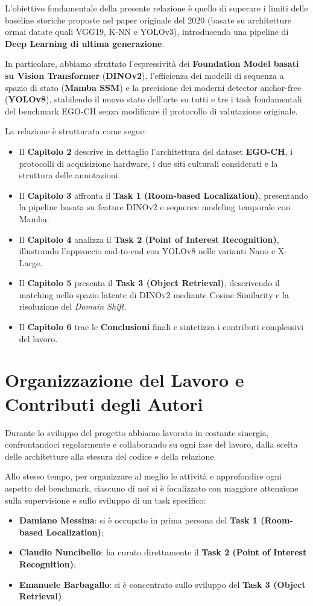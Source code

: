 \documentclass[a4paper,12pt]{report}
\begin{document}
L'obiettivo fondamentale della presente relazione è quello di superare i limiti delle baseline storiche proposte nel paper originale del 2020 (basate su architetture ormai datate quali VGG19, K-NN e YOLOv3), introducendo una pipeline di \textbf{Deep Learning di ultima generazione}. 

In particolare, abbiamo sfruttato l'espressività dei \textbf{Foundation Model basati su Vision Transformer} (\textbf{DINOv2}), l'efficienza dei modelli di sequenza a spazio di stato (\textbf{Mamba SSM}) e la precisione dei moderni detector anchor-free (\textbf{YOLOv8}), stabilendo il nuovo stato dell'arte su tutti e tre i task fondamentali del benchmark EGO-CH senza modificare il protocollo di valutazione originale.

La relazione è strutturata come segue:
\begin{itemize}
    \item Il \textbf{Capitolo 2} descrive in dettaglio l'architettura del dataset \textbf{EGO-CH}, i protocolli di acquisizione hardware, i due siti culturali considerati e la struttura delle annotazioni.
    \item Il \textbf{Capitolo 3} affronta il \textbf{Task 1 (Room-based Localization)}, presentando la pipeline basata su feature DINOv2 e sequence modeling temporale con Mamba.
    \item Il \textbf{Capitolo 4} analizza il \textbf{Task 2 (Point of Interest Recognition)}, illustrando l'approccio end-to-end con YOLOv8 nelle varianti Nano e X-Large.
    \item Il \textbf{Capitolo 5} presenta il \textbf{Task 3 (Object Retrieval)}, descrivendo il matching nello spazio latente di DINOv2 mediante Cosine Similarity e la risoluzione del \emph{Domain Shift}.
    \item Il \textbf{Capitolo 6} trae le \textbf{Conclusioni} finali e sintetizza i contributi complessivi del lavoro.
\end{itemize}

\section{Organizzazione del Lavoro e Contributi degli Autori}

Durante lo sviluppo del progetto abbiamo lavorato in costante sinergia, confrontandoci regolarmente e collaborando su ogni fase del lavoro, dalla scelta delle architetture alla stesura del codice e della relazione.

Allo stesso tempo, per organizzare al meglio le attività e approfondire ogni aspetto del benchmark, ciascuno di noi si è focalizzato con maggiore attenzione sulla supervisione e sullo sviluppo di un task specifico:
\begin{itemize}
    \item \textbf{Damiano Messina}: si è occupato in prima persona del \textbf{Task 1 (Room-based Localization)};
    \item \textbf{Claudio Nuncibello}: ha curato direttamente il \textbf{Task 2 (Point of Interest Recognition)};
    \item \textbf{Emanuele Barbagallo}: si è concentrato sullo sviluppo del \textbf{Task 3 (Object Retrieval)}.
\end{itemize}
\end{document}
